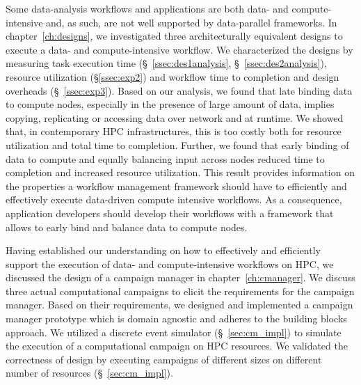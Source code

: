 Some data-analysis workflows and applications are both data- and 
compute-intensive and, as such, are not well supported by data-parallel 
frameworks. In chapter~\ref{ch:designs}, we investigated three architecturally 
equivalent designs to execute a data- and compute-intensive workflow. We 
characterized the designs by measuring task execution time 
(\S~\ref{ssec:des1analysis}, \S~\ref{ssec:des2analysis}), resource utilization 
(\S\ref{ssec:exp2}) and workflow time to completion and design overheads 
(\S~\ref{ssec:exp3}). Based on our analysis, we found that late binding data to 
compute nodes, especially in the presence of large amount of data, implies 
copying, replicating or accessing data over network and at runtime. We showed 
that, in contemporary HPC infrastructures, this is too costly both for resource 
utilization and total time to completion. Further, we found that early binding 
of data to compute and equally balancing input across nodes reduced time to 
completion and increased resource utilization. This result provides information 
on the properties a workflow management framework should have to efficiently 
and effectively execute data-driven compute intensive workflows. As a 
consequence, application developers should develop their workflows with a 
framework that allows to early bind and balance data to compute nodes.

Having established our understanding on how to effectively and efficiently
support the execution of data- and compute-intensive workflows on HPC, we 
discussed the design of a campaign manager in chapter~\ref{ch:cmanager}. We 
discuss three actual computational campaigns to elicit the requirements for the 
campaign manager. Based on their requirements, we designed and implemented a 
campaign manager prototype which is domain agnostic and adheres to the building 
blocks approach. We utilized a discrete event simulator (\S~\ref{sec:cm_impl}) 
to simulate the execution of a computational campaign on HPC resources. We 
validated the correctness of design by executing campaigns of different sizes 
on different number of resources (\S~\ref{sec:cm_impl}).

